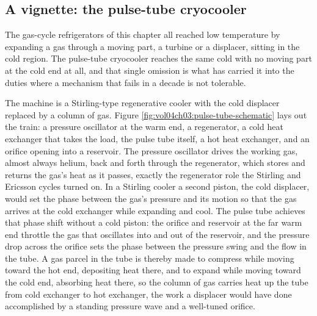 

\subsection{A vignette: the pulse-tube cryocooler}

The gas-cycle refrigerators of this chapter all reached low temperature by
expanding a gas through a moving part, a turbine or a displacer, sitting in the
cold region. The pulse-tube cryocooler reaches the same cold with no moving part at
the cold end at all, and that single omission is what has carried it into the
duties where a mechanism that fails in a decade is not tolerable.

The machine is a Stirling-type regenerative cooler with the cold displacer replaced
by a column of gas. Figure \ref{fig:vol04ch03:pulse-tube-schematic} lays out the
train: a pressure oscillator at the warm end, a regenerator, a cold heat exchanger
that takes the load, the pulse tube itself, a hot heat exchanger, and an orifice
opening into a reservoir. The pressure oscillator drives the working gas, almost
always helium, back and forth through the regenerator, which stores and returns the
gas's heat as it passes, exactly the regenerator role the Stirling and Ericsson
cycles turned on. In a Stirling cooler a second piston, the cold displacer, would
set the phase between the gas's pressure and its motion so that the gas arrives at
the cold exchanger while expanding and cool. The pulse tube achieves that phase
shift without a cold piston: the orifice and reservoir at the far warm end throttle
the gas that oscillates into and out of the reservoir, and the pressure drop across
the orifice sets the phase between the pressure swing and the flow in the tube. A
gas parcel in the tube is thereby made to compress while moving toward the hot end,
depositing heat there, and to expand while moving toward the cold end, absorbing
heat there, so the column of gas carries heat up the tube from cold exchanger to hot
exchanger, the work a displacer would have done accomplished by a standing pressure
wave and a well-tuned orifice.

